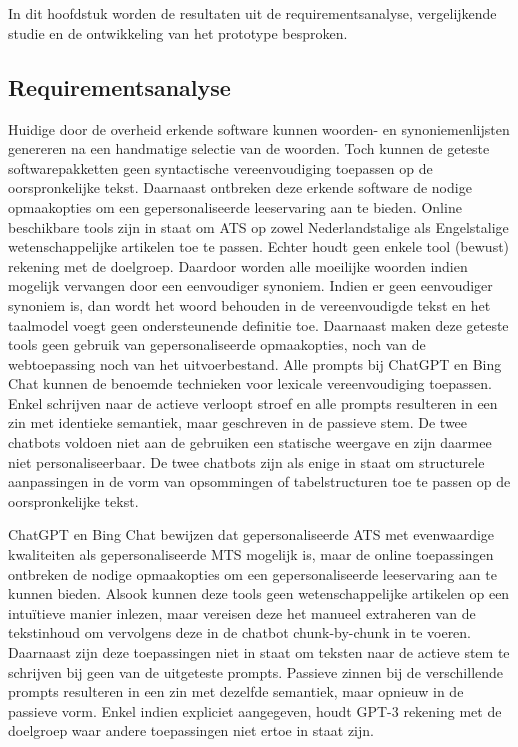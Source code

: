 \chapter{}%
\label{ch:resultaten}

In dit hoofdstuk worden de resultaten uit de requirementsanalyse, vergelijkende studie en de ontwikkeling van het prototype besproken. 

\section{Requirementsanalyse}


Huidige door de overheid erkende software kunnen woorden- en synoniemenlijsten genereren na een handmatige selectie van de woorden. Toch kunnen de geteste softwarepakketten geen syntactische vereenvoudiging toepassen op de oorspronkelijke tekst. Daarnaast ontbreken deze erkende software de nodige opmaakopties om een gepersonaliseerde leeservaring aan te bieden. Online beschikbare tools zijn in staat om ATS op zowel Nederlandstalige als Engelstalige wetenschappelijke artikelen toe te passen. Echter houdt geen enkele tool (bewust) rekening met de doelgroep. Daardoor worden alle moeilijke woorden indien mogelijk vervangen door een eenvoudiger synoniem. Indien er geen eenvoudiger synoniem is, dan wordt het woord behouden in de vereenvoudigde tekst en het taalmodel voegt geen ondersteunende definitie toe. Daarnaast maken deze geteste tools geen gebruik van gepersonaliseerde opmaakopties, noch van de webtoepassing noch van het uitvoerbestand. Alle prompts bij ChatGPT en Bing Chat kunnen de benoemde technieken voor lexicale vereenvoudiging toepassen. Enkel schrijven naar de actieve verloopt stroef en alle prompts resulteren in een zin met identieke semantiek, maar geschreven in de passieve stem. De twee chatbots voldoen niet aan de gebruiken een statische weergave en zijn daarmee niet personaliseerbaar. De twee chatbots zijn als enige in staat om structurele aanpassingen in de vorm van opsommingen of tabelstructuren toe te passen op de oorspronkelijke tekst.

\medspace

ChatGPT en Bing Chat bewijzen dat gepersonaliseerde ATS met evenwaardige kwaliteiten als gepersonaliseerde MTS mogelijk is, maar de online toepassingen ontbreken de nodige opmaakopties om een gepersonaliseerde leeservaring aan te kunnen bieden. Alsook kunnen deze tools geen wetenschappelijke artikelen op een intuïtieve manier inlezen, maar vereisen deze het manueel extraheren van de tekstinhoud om vervolgens deze in de chatbot chunk-by-chunk in te voeren. Daarnaast zijn deze toepassingen niet in staat om teksten naar de actieve stem te schrijven bij geen van de uitgeteste prompts. Passieve zinnen bij de verschillende prompts resulteren in een zin met dezelfde semantiek, maar opnieuw in de passieve vorm. Enkel indien expliciet aangegeven, houdt GPT-3 rekening met de doelgroep waar andere toepassingen niet ertoe in staat zijn.

